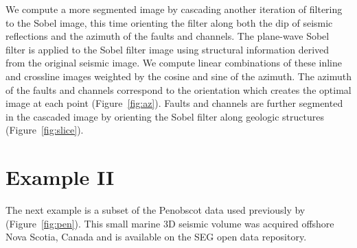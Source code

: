 We compute a more segmented image by cascading another iteration of filtering to the Sobel image, this time orienting the filter along both the dip of seismic reflections and the azimuth of the faults and channels.
The plane-wave Sobel filter is applied to the Sobel filter image using structural information derived from the original seismic image.
We compute linear combinations of these inline and crossline images weighted by the cosine and sine of the azimuth.
The azimuth of the faults and channels correspond to the orientation which creates the optimal image at each point (Figure~\ref{fig:az}).
Faults and channels are further segmented in the cascaded image by orienting the Sobel filter along geologic structures (Figure~\ref{fig:slice}).


\section{Example II}
The next example is a subset of the Penobscot data used previously by \cite{kington} (Figure~\ref{fig:pen}).
This small marine 3{D} seismic volume was acquired offshore Nova Scotia, Canada and is available on the SEG open data repository.


